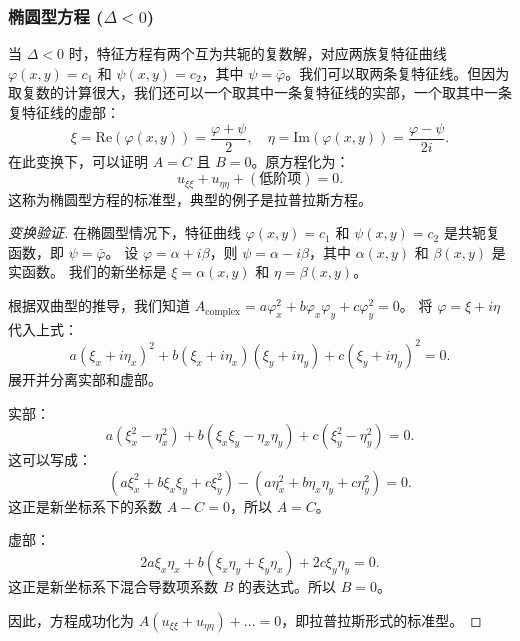 \documentclass[12pt,a4paper]{article}
\numberwithin{subsection}{section}
\numberwithin{subsubsection}{subsection}
\theoremstyle{plain}
\theoremstyle{definition}
\theoremstyle{remark}
\begin{document}
	\subsubsection{椭圆型方程 (\texorpdfstring{$\Delta < 0$}{Delta < 0})}
	当 \(\Delta < 0\) 时，特征方程有两个互为共轭的复数解，对应两族复特征曲线 \(\varphi(x,y) = c_1\) 和 \(\psi(x,y) = c_2\)，其中 \(\psi = \bar{\varphi}\)。我们可以取两条复特征线。但因为取复数的计算很大，我们还可以一个取其中一条复特征线的实部，一个取其中一条复特征线的虚部：
	\[
	\xi = \text{Re}(\varphi(x,y)) = \frac{\varphi+\psi}{2}, \quad \eta = \text{Im}(\varphi(x,y)) = \frac{\varphi-\psi}{2i}.
	\]
	在此变换下，可以证明 \(A=C\) 且 \(B=0\)。原方程化为：
	\begin{equation}\label{eq:elliptic_canonical}
		u_{\xi\xi} + u_{\eta\eta} + (\text{低阶项}) = 0.
	\end{equation}
	这称为椭圆型方程的标准型，典型的例子是拉普拉斯方程。
	
	\begin{proof}[变换验证]
		在椭圆型情况下，特征曲线 \(\varphi(x,y)=c_1\) 和 \(\psi(x,y)=c_2\) 是共轭复函数，即 \(\psi = \bar{\varphi}\)。
		设 \(\varphi = \alpha + i\beta\)，则 \(\psi = \alpha - i\beta\)，其中 \(\alpha(x,y)\) 和 \(\beta(x,y)\) 是实函数。
		我们的新坐标是 \(\xi = \alpha(x,y)\) 和 \(\eta = \beta(x,y)\)。
		
		根据双曲型的推导，我们知道 \(A_\text{complex} = a\varphi_x^2 + b\varphi_x\varphi_y + c\varphi_y^2 = 0\)。
		将 \(\varphi = \xi + i\eta\) 代入上式：
		\[
		a(\xi_x+i\eta_x)^2 + b(\xi_x+i\eta_x)(\xi_y+i\eta_y) + c(\xi_y+i\eta_y)^2 = 0.
		\]
		展开并分离实部和虚部。
		
		实部：
		\[
		a(\xi_x^2-\eta_x^2) + b(\xi_x\xi_y - \eta_x\eta_y) + c(\xi_y^2-\eta_y^2) = 0.
		\]
		这可以写成：
		\[
		(a\xi_x^2 + b\xi_x\xi_y + c\xi_y^2) - (a\eta_x^2 + b\eta_x\eta_y + c\eta_y^2) = 0.
		\]
		这正是新坐标系下的系数 \(A-C=0\)，所以 \(A=C\)。
		
		虚部：
		\[
		2a\xi_x\eta_x + b(\xi_x\eta_y + \xi_y\eta_x) + 2c\xi_y\eta_y = 0.
		\]
		这正是新坐标系下混合导数项系数 \(B\) 的表达式。所以 \(B=0\)。
		
		因此，方程成功化为 \(A(u_{\xi\xi} + u_{\eta\eta}) + \dots = 0\)，即拉普拉斯形式的标准型。
	\end{proof}
	
\end{document}
